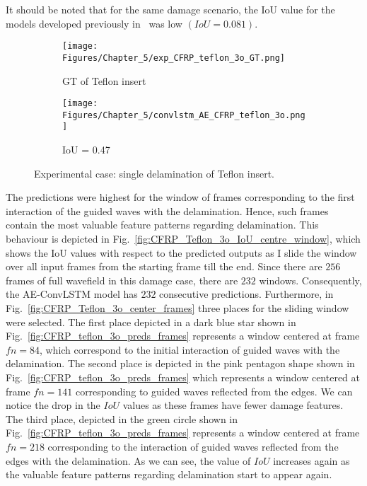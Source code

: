 It should be noted that for the same damage scenario, the IoU value for the models developed previously in~\cite{Ijjeh2021} was low \((IoU=0.081)\).
\begin{figure} [!h]
	\centering
	\begin{subfigure}[b]{0.47\textwidth}
		\centering
		\texttt{[image: Figures/Chapter\_5/exp\_CFRP\_teflon\_3o\_GT.png]}
		\caption{GT of Teflon insert}
		\label{fig:exp_CFRP_teflon_3o_GT}
	\end{subfigure}
	\begin{subfigure}[b]{0.47\textwidth}
		\centering
		\texttt{[image: Figures/Chapter\_5/convlstm\_AE\_CFRP\_teflon\_3o.png]}
		\caption{IoU = 0.47}
		\label{fig:convlstm_AE_CFRP_teflon_3o}
	\end{subfigure}
	\caption{Experimental case: single delamination of Teflon insert.}
	\label{fig:exp_Teflon_insert}
\end{figure} 

The predictions were highest for the window of frames corresponding to the first interaction of the guided waves with the delamination.
Hence, such frames contain the most valuable feature patterns regarding delamination. 
This behaviour is depicted in Fig.~\ref{fig:CFRP_Teflon_3o_IoU_centre_window}, which shows the IoU values with respect to the predicted outputs as I slide the window over all input frames from the starting frame till the end.
Since there are \(256\) frames of full wavefield in this damage case, there are \(232\) windows.
Consequently, the AE-ConvLSTM model has \(232\) consecutive predictions.
Furthermore, in Fig.~\ref{fig:CFRP_Teflon_3o_center_frames} three places for the sliding window were selected. 
The first place depicted in a dark blue star shown in Fig.~\ref{fig:CFRP_teflon_3o_preds_frames} represents a window centered at frame \(fn=84\), which correspond to the initial interaction of guided waves with the delamination.
The second place is depicted in the pink pentagon shape shown in Fig.~\ref{fig:CFRP_teflon_3o_preds_frames} which represents a window centered at frame \(fn=141\) corresponding to guided waves reflected from the edges.
We can notice the drop in the \(IoU\) values as these frames have fewer damage features.
The third place, depicted in the green circle shown in Fig.~\ref{fig:CFRP_teflon_3o_preds_frames} represents a window centered at frame \(fn=218\) corresponding to the interaction of guided waves reflected from the edges with the delamination.
As we can see, the value of \(IoU\) increases again as the valuable feature patterns regarding delamination start to appear again.

